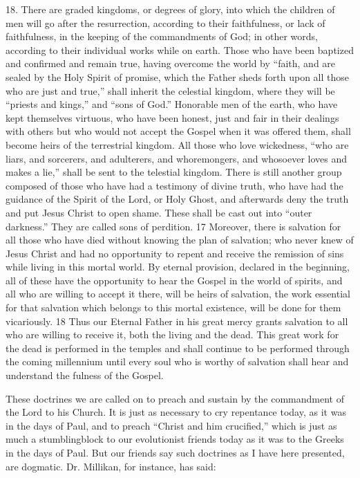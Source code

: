 18. There are graded kingdoms, or degrees of glory, into which the children of men will go
after the resurrection, according to their faithfulness, or lack of faithfulness, in the keeping of
the commandments of God; in other words, according to their individual works while on
earth. Those who have been baptized and confirmed and remain true, having overcome the
world by ``faith, and are sealed by the Holy Spirit of promise, which the Father sheds forth
upon all those who are just and true,'' shall inherit the celestial kingdom, where they will be
``priests and kings,'' and ``sons of God.'' Honorable men of the earth, who have kept
themselves virtuous, who have been honest, just and fair in their dealings with others but
who would not accept the Gospel when it was offered them, shall become heirs of the
terrestrial kingdom. All those who love wickedness, ``who are liars, and sorcerers, and
adulterers, and whoremongers, and whosoever loves and makes a lie,'' shall be sent to the
telestial kingdom. There is still another group composed of those who have had a testimony
of divine truth, who have had the guidance of the Spirit of the Lord, or Holy Ghost, and
afterwards deny the truth and put Jesus Christ to open shame. These shall be cast out into
``outer darkness.'' They are called sons of perdition. 17 Moreover, there is salvation for all
those who have died without knowing the plan of salvation; who never knew of Jesus Christ
and had no opportunity to repent and receive the remission of sins while living in this mortal
world. By eternal provision, declared in the beginning, all of these have the opportunity to
hear the Gospel in the world of spirits, and all who are willing to accept it there, will be heirs
of salvation, the work essential for that salvation which belongs to this mortal existence, will
be done for them vicariously. 18 Thus our Eternal Father in his great mercy grants salvation
to all who are willing to receive it, both the living and the dead. This great work for the dead
is performed in the temples and shall continue to be performed through the coming
millennium until every soul who is worthy of salvation shall hear and understand the fulness
of the Gospel.

These doctrines we are called on to preach and sustain by the commandment of the Lord to
his Church. It is just as necessary to cry repentance today, as it was in the days of Paul, and
to preach ``Christ and him crucified,'' which is just as much a stumblingblock to our
evolutionist friends today as it was to the Greeks in the days of Paul. But our friends say such
doctrines as I have here presented, are dogmatic. Dr. Millikan, for instance, has said:

